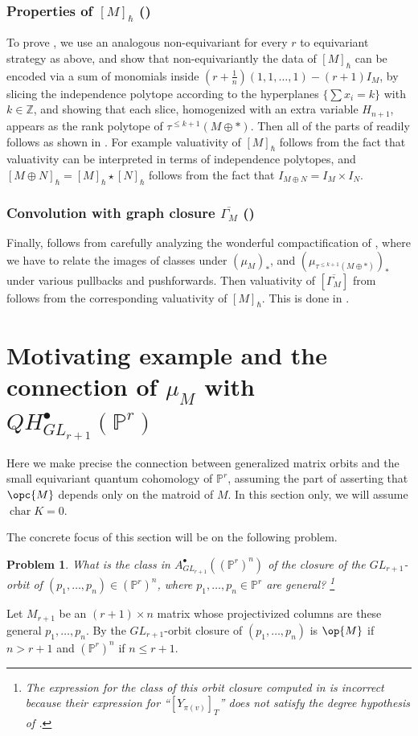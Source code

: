 \documentclass[12pt]{amsart}
\newcommand{\mb}{\mathbb}
\theoremstyle{plain}
\newtheorem{Pro}[Thm]{Problem}
\theoremstyle{definition}
\theoremstyle{remark}
\begin{document}
\subsubsection{Properties of $[M]_{\hbar}$ ()}
To prove , we use an analogous non-equivariant for every $r$ to equivariant strategy as above, and show that non-equivariantly the data of $[M]_{\hbar}$ can be encoded via a sum of monomials inside $(r+\frac{1}{n})(1,1,\ldots,1)-(r+1)I_M$, by slicing the independence polytope according to the hyperplanes $\{\sum x_i=k\}$ with $k \in \mathbb{Z}$, and showing that each slice, homogenized with an extra variable $H_{n+1}$, appears as the rank polytope of $\tau^{\le k+1}(M\oplus \ast)$. Then all of the parts of  readily follows as shown in . For example valuativity of $[M]_{\hbar}$ follows from the fact that valuativity can be interpreted in terms of independence polytopes, and $[M\oplus N]_{\hbar}=[M]_{\hbar}\star [N]_{\hbar}$ follows from the fact that $I_{M\oplus N}=I_M \times I_N$.

\subsubsection{Convolution with graph closure $\overline{\Gamma_M}$ ()}
Finally,  follows from carefully analyzing the wonderful compactification of \cite{LiLi}, where we have to relate the images of classes under $(\mu_M)_*$, and $(\mu_{\tau^{\le k+1}(M\oplus \ast)})_*$ under various pullbacks and pushforwards. Then valuativity of $[\overline{\Gamma_M}]$ from  follows from the corresponding valuativity of $[M]_{\hbar}$. This is done in .

\section{Motivating example and the connection of $\mu_M$ with $QH_{GL_{r+1}}^\bullet(\mb{P}^r)$}
\label{KSI}

Here we make precise the connection between generalized matrix orbits and the small equivariant quantum cohomology of $\mb{P}^r$, assuming the part of  asserting that $\opc{M}$ depends only on the matroid of $M$. In this section only, we will assume $\operatorname{char} K = 0$.

The concrete focus of this section will be on the following problem.
\begin{Pro}
\label{ProS}
What is the class in $A^{\bullet}_{GL_{r+1}}((\mb{P}^r)^n)$ of the closure of the $GL_{r+1}$-orbit of $(p_1,\ldots,p_n)\in (\mb{P}^r)^n$, where $p_1, \ldots, p_n \in \mb{P}^r$ are general? \footnote{The expression for the class of this orbit closure computed in \cite[Theorem 5.1]{Fink} is incorrect because their expression for ``$[Y_{\pi(v)}]_T$'' does not satisfy the degree hypothesis of \cite[Theorem 3.5 (ii)]{Fink}.}
\end{Pro}
Let $M_{r+1}$ be an $(r+1) \times n$ matrix whose projectivized columns are these general $p_1, \ldots, p_n$. By  the $GL_{r+1}$-orbit closure of $(p_1,\ldots, p_n)$ is $\op{M}$ if $n > r+1$ and $(\mb{P}^r)^n$ if $n \le r+1$. 
\end{document}
